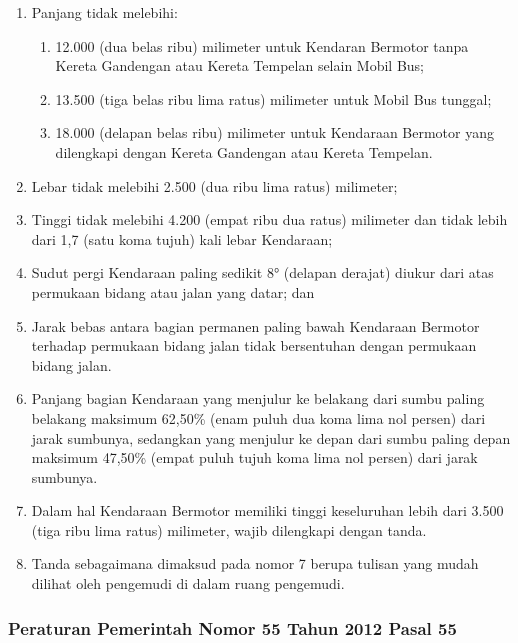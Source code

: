 \begin{enumerate}
  \item Panjang tidak melebihi:
  \begin{enumerate}
    \item 12.000 (dua belas ribu) milimeter untuk Kendaran Bermotor tanpa Kereta Gandengan atau Kereta Tempelan selain Mobil Bus;
    \item 13.500 (tiga belas ribu lima ratus) milimeter untuk Mobil Bus tunggal;
    \item 18.000 (delapan belas ribu) milimeter untuk Kendaraan Bermotor yang dilengkapi dengan Kereta Gandengan atau Kereta Tempelan.
  \end{enumerate}
  \item Lebar tidak melebihi 2.500 (dua ribu lima ratus)
  milimeter;
  \item Tinggi tidak melebihi 4.200 (empat ribu dua ratus) milimeter dan tidak lebih dari 1,7 (satu koma tujuh) kali lebar Kendaraan;
  \item Sudut pergi Kendaraan paling sedikit 8° (delapan derajat) diukur dari atas permukaan bidang atau jalan yang datar; dan
  \item Jarak bebas antara bagian permanen paling bawah Kendaraan Bermotor terhadap permukaan bidang jalan tidak bersentuhan dengan permukaan bidang jalan.
  \item Panjang bagian Kendaraan yang menjulur ke belakang dari sumbu paling belakang maksimum 62,50\% (enam puluh dua koma lima nol persen) dari jarak sumbunya, sedangkan yang menjulur ke depan dari sumbu paling depan maksimum 47,50\% (empat puluh tujuh koma lima nol persen) dari jarak sumbunya.
  \item Dalam hal Kendaraan Bermotor memiliki tinggi keseluruhan lebih dari 3.500 (tiga ribu lima ratus) milimeter, wajib dilengkapi dengan tanda.
  \item Tanda sebagaimana dimaksud pada nomor 7 berupa tulisan yang mudah dilihat oleh pengemudi di dalam ruang pengemudi.
\end{enumerate}

\subsubsection{Peraturan Pemerintah Nomor 55 Tahun 2012 Pasal 55}

